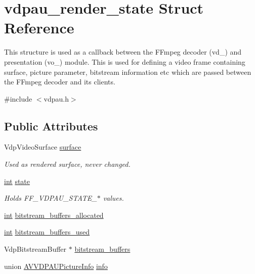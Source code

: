 \hypertarget{structvdpau__render__state}{}\section{vdpau\+\_\+render\+\_\+state Struct Reference}
\label{structvdpau__render__state}


This structure is used as a callback between the F\+Fmpeg decoder (vd\+\_\+) and presentation (vo\+\_\+) module. This is used for defining a video frame containing surface, picture parameter, bitstream information etc which are passed between the F\+Fmpeg decoder and its clients.  




{\ttfamily \#include $<$vdpau.\+h$>$}

\subsection*{Public Attributes}
\begin{DoxyCompactItemize}
\item 
Vdp\+Video\+Surface \hyperlink{structvdpau__render__state_a03db4a28b9c8187ca69335d6aaa01d3f}{surface}
\begin{DoxyCompactList}\small\item\em Used as rendered surface, never changed. \end{DoxyCompactList}\item 
\hyperlink{xmltok_8h_a5a0d4a5641ce434f1d23533f2b2e6653}{int} \hyperlink{structvdpau__render__state_ab52402f2ec91ac3daf3c39bee6e6b717}{state}
\begin{DoxyCompactList}\small\item\em Holds F\+F\+\_\+\+V\+D\+P\+A\+U\+\_\+\+S\+T\+A\+T\+E\+\_\+$\ast$ values. \end{DoxyCompactList}\item 
\hyperlink{xmltok_8h_a5a0d4a5641ce434f1d23533f2b2e6653}{int} \hyperlink{structvdpau__render__state_ab0e6b4e8689307349f7f10e451d57329}{bitstream\+\_\+buffers\+\_\+allocated}
\item 
\hyperlink{xmltok_8h_a5a0d4a5641ce434f1d23533f2b2e6653}{int} \hyperlink{structvdpau__render__state_ab030c29ece1ef5130f78e69fa19af738}{bitstream\+\_\+buffers\+\_\+used}
\item 
Vdp\+Bitstream\+Buffer $\ast$ \hyperlink{structvdpau__render__state_a5716971d7108b6a94ee628fb4a884e32}{bitstream\+\_\+buffers}
\item 
union \hyperlink{union_a_v_v_d_p_a_u_picture_info}{A\+V\+V\+D\+P\+A\+U\+Picture\+Info} \hyperlink{structvdpau__render__state_a761eb1f0760c95d8e755b4b9ac20c77c}{info}
\end{DoxyCompactItemize}


